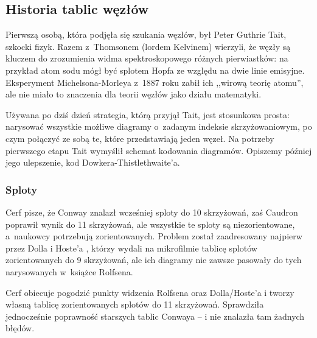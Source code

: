 
\subsection{Historia tablic węzłów}
Pierwszą osobą, która podjęła się szukania węzłów, był Peter Guthrie Tait, szkocki fizyk.
%
Razem z~Thomsonem (lordem Kelvinem) wierzyli, że węzły są kluczem do zrozumienia widma spektroskopowego różnych pierwiastków: na przykład atom sodu mógł być splotem Hopfa ze względu na dwie linie emisyjne.
%
Eksperyment Michelsona-Morleya z~1887 roku zabił ich ,,wirową teorię atomu'', ale nie miało to znaczenia dla teorii węzłów jako działu matematyki.

Używana po dziś dzień strategia, którą przyjął Tait, jest stosunkowa prosta: narysować wszystkie możliwe diagramy o~zadanym indeksie skrzyżowaniowym, po czym połączyć ze sobą te, które przedstawiają jeden węzeł.
Na potrzeby pierwszego etapu Tait wymyślił schemat kodowania diagramów.
Opiszemy później jego ulepszenie, kod Dowkera-Thistlethwaite'a.













\subsubsection{Sploty}
Cerf \cite{cerf1998} pisze, że Conway \cite{conway1970} znalazł wcześniej sploty do 10 skrzyżowań, zaś Caudron \cite{caudron1982} poprawił wynik do 11 skrzyżowań, ale wszystkie te sploty są niezorientowane, a~naukowcy potrzebują zorientowanych.
%
%
%
Problem został zaadresowany najpierw przez Dolla i Hoste'a \cite{doll1991}, którzy wydali na mikrofilmie tablicę splotów zorientowanych do 9 skrzyżowań, ale ich diagramy nie zawsze pasowały do tych narysowanych w~książce Rolfsena.
%
%

Cerf obiecuje pogodzić punkty widzenia Rolfsena oraz Dolla/Hoste'a i tworzy własną tablicę zorientowanych splotów do 11 skrzyżowań.
Sprawdziła jednocześnie poprawność starszych tablic Conwaya -- i nie znalazła tam żadnych błędów.

